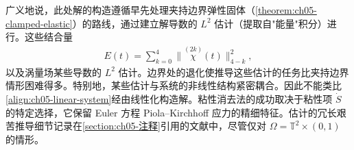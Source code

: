 \documentclass[../../main.tex]{subfiles}
\begin{document}
广义地说，此处解的构造遵循早先处理夹持边界弹性固体（\cref{theorem:ch05-clamped-elastic}）的路线，通过建立解导数的 $L^{2}$ 估计（提取自"能量"积分）进行。这些结合量
\begin{align}
E(t)=\sum_{k=0}^{4}\|\overset{(2k)}{\chi}(t)\|_{4-k}^{2},\label{align:ch05-E-vacuum}
\end{align}
以及涡量场某些导数的 $L^{2}$ 估计。边界处的退化使推导这些估计的任务比夹持边界情形困难得多。特别地，某些估计与系统的非线性结构紧密耦合。因此不能类比\eqref{align:ch05-linear-system}经由线性化构造解。粘性消去法的成功取决于粘性项 $\dot{S}$ 的特定选择，它保留 Euler 方程 Piola--Kirchhoff 应力的精细特征。估计的冗长艰苦推导细节记录在\cref{section:ch05-注释}引用的文献中，尽管仅对 $\Omega=\mathbb{T}^{2}\times(0,1)$ 的情形。
\end{document}
